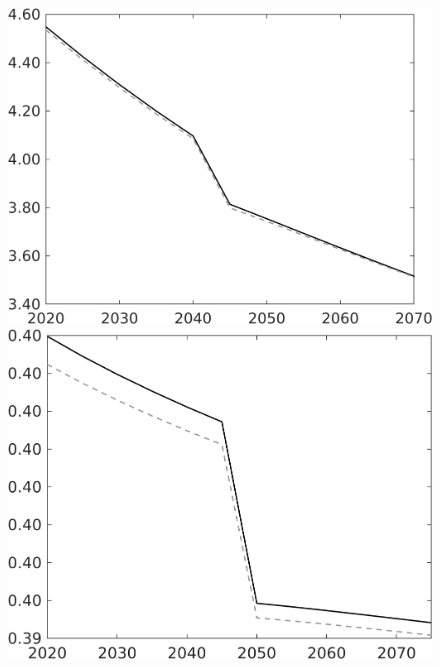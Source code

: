 \begin{figure}[h!!]
\begin{minipage}[]{0.32\textwidth}
\end{minipage}			
\begin{minipage}[]{0.32\textwidth}
\includegraphics[width=1\textwidth]{../../codding_model/own_basedOnFried/optimalPol_010922_revision/figures/all_13Sept22/CompTauf_bytaul_Reg0_gAn_spillover0_nsk0_xgr0_knspil0_sep0_LFlimit1_emsbase0_countec0_GovRev0_etaa0.79_lgd0.png}
\end{minipage}			
\begin{minipage}[]{0.32\textwidth}
\includegraphics[width=1\textwidth]{../../codding_model/own_basedOnFried/optimalPol_010922_revision/figures/all_13Sept22/CompTauf_bytaul_Reg0_EY_spillover0_nsk0_xgr0_knspil0_sep0_LFlimit1_emsbase0_countec0_GovRev0_etaa0.79_lgd0.png}

\end{minipage}
\end{figure}
